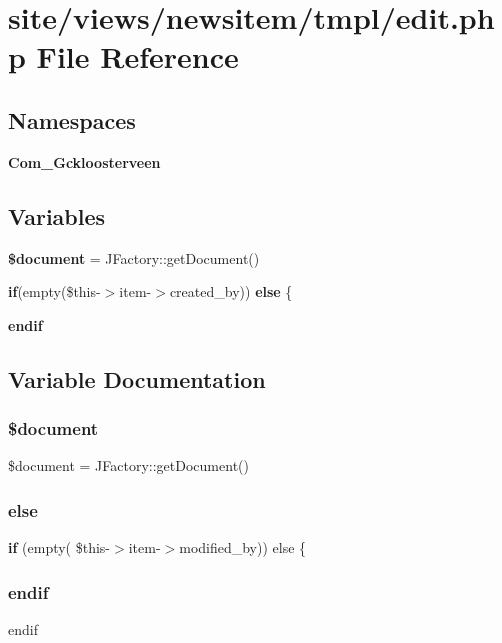 \section{site/views/newsitem/tmpl/edit.php File Reference}
\label{site_2views_2newsitem_2tmpl_2edit_8php}
\subsection*{Namespaces}
\begin{DoxyCompactItemize}
\item 
 \textbf{ Com\+\_\+\+Gckloosterveen}
\end{DoxyCompactItemize}
\subsection*{Variables}
\begin{DoxyCompactItemize}
\item 
\textbf{ \$document} = J\+Factory\+::get\+Document()
\item 
\textbf{ if}(empty(\$this-\/$>$item-\/$>$created\+\_\+by)) \textbf{ else} \{
\item 
\textbf{ endif}
\end{DoxyCompactItemize}


\subsection{Variable Documentation}
\mbox{\label{site_2views_2newsitem_2tmpl_2edit_8php_ac5a31edb787609a3143dec9bfa8063ea}} 
\subsubsection{\$document}
{\footnotesize\ttfamily \$document = J\+Factory\+::get\+Document()}

\mbox{\label{site_2views_2newsitem_2tmpl_2edit_8php_a1fcd5573ff46bbbe8e9dc35fb0051b1a}} 
\subsubsection{else}
{\footnotesize\ttfamily \textbf{ if} (empty( \$this-\/$>$item-\/$>$modified\+\_\+by)) else \{}

\mbox{\label{site_2views_2newsitem_2tmpl_2edit_8php_a82cd33ca97ff99f2fcc5e9c81d65251b}} 
\subsubsection{endif}
{\footnotesize\ttfamily endif}

